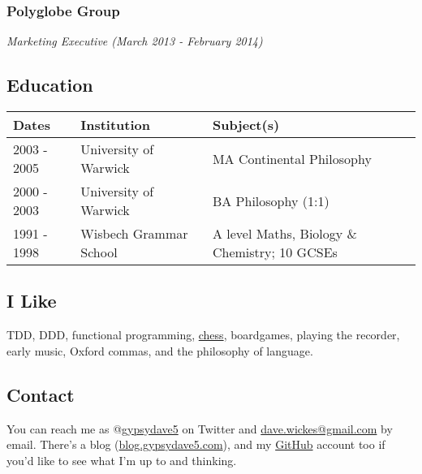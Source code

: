 \documentclass[11pt]{article}
\begin{document}
\subsubsection*{Polyglobe Group}
\label{sec:org8d6c38e}
\emph{Marketing Executive (March 2013 - February 2014)}

\subsection*{Education}
\label{sec:orgafb2eef}
\begin{center}
\begin{tabular}{lll}
Dates & Institution & Subject(s)\\
\hline
2003 - 2005 & University of Warwick & MA Continental Philosophy\\
2000 - 2003 & University of Warwick & BA Philosophy (1:1)\\
1991 - 1998 & Wisbech Grammar School & A level Maths, Biology \& Chemistry; 10 GCSEs\\
\end{tabular}
\end{center}

\subsection*{I Like}
\label{sec:org0c43ab2}
TDD, DDD, functional programming, \href{https://www.chess.com/member/gypsydave5}{chess}, boardgames, playing the recorder, early music, Oxford commas, and the philosophy of language.

\subsection*{Contact}
\label{sec:org1bb3471}
You can reach me as @\href{https://twitter.com/gypsydave5}{gypsydave5} on Twitter and \href{mailto:dave@gypsydave5.com}{dave.wickes@gmail.com} by email. There's a blog (\href{http://blog.gypsydave5.com/}{blog.gypsydave5.com}), and my \href{https://github.com/gypsydave5}{GitHub} account too if you'd like to see what I'm up to and thinking.
\end{document}
